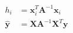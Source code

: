 \documentclass[10pt]{article}
\begin{document}
\begin{align*}\begin{split}
h_i &= \boldsymbol x_i^T \boldsymbol A^{-1} \boldsymbol x_i \\
\boldsymbol{\hat{y}} &= \boldsymbol X \boldsymbol A^{-1} \boldsymbol X^T \boldsymbol y \\
\end{split}\end{align*}
\end{document}
